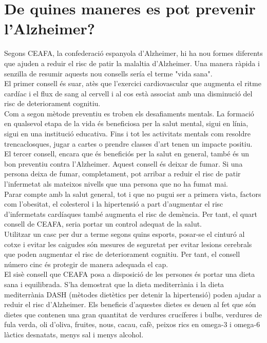 \documentclass[a4paper,12pt]{report}
\begin{document}
\section*{De quines maneres es pot prevenir l'Alzheimer?}
Segons CEAFA, la confederació espanyola d'Alzheimer, hi ha nou formes diferents que ajuden a reduir el risc de patir la malaltia d'Alzheimer. Una manera ràpida i senzilla de resumir aquests nou consells sería el terme "vida sana".\\
El primer consell és suar, atès que l'exercici cardiovascular que augmenta el ritme cardíac i el flux de sang al cervell i al cos està associat amb una disminució del risc de deteriorament cognitiu.\\
Com a segon mètode preventiu es troben els desafiaments mentals. La formació en qualsevol etapa de la vida és beneficiosa per la salut mental, sigui en línia, sigui en una institució educativa. Fins i tot les activitats mentals com resoldre trencaclosques, jugar a cartes o prendre classes d'art tenen un impacte positiu.\\
El tercer consell, encara que és beneficiós per la salut en general, també és un bon preventiu contra l'Alzheimer. Aquest consell és deixar de fumar. Si una persona deixa de fumar, completament, pot arribar a reduir el risc de patir l'infermetat als mateixos nivells que una persona que no ha fumat mai.\\
Parar compte amb la salut general, tot i que no pugui ser a primera vista, factors com l'obesitat, el colesterol i la hipertensió a part d'augmentar el risc d'infermetats cardíaques també augmenta el risc de demència. Per tant, el quart consell de CEAFA, seria portar un control adequat de la salut.\\
Utilitzar un casc per dur a terme segons quins esports, posar-se el cinturó al cotxe i evitar les caigudes són mesures de seguretat per evitar lesions cerebrals que poden augmentar el risc de deteriorament cognitiu. Per tant, el consell número cinc és protegir de manera adequada el cap.\\
El sisè consell que CEAFA posa a disposició de les persones és portar una dieta sana i equilibrada. S'ha demostrat que la dieta mediterrània i la dieta mediterrània DASH (mètodes dietètics per detenir la hipertensió) poden ajudar a reduir el risc d'Alzheimer. Els beneficis d'aquestes dietes es deuen al fet que són dietes que contenen una gran quantitat de verdures crucíferes i bulbs, verdures de fula verda, oli d'oliva, fruites, nous, cacau, cafè, peixos rics en omega-3 i omega-6 làctics desnatats, menys sal i menys alcohol.\\
\end{document}

